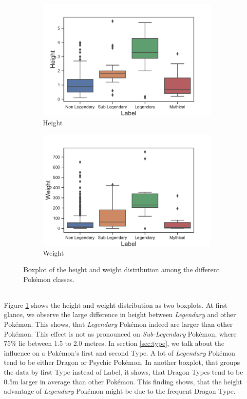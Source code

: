 \documentclass[conference]{IEEEtran}
\begin{document}
\begin{figure}[h]
	\centering
	\begin{subfigure}{0.4\textwidth}
		\includegraphics[width=\textwidth]{../../figures/boxplot_height.pdf}
		\caption{Height}
	\end{subfigure}
	\begin{subfigure}{0.4\textwidth}
	\includegraphics[width=\textwidth]{../../figures/boxplot_weight.pdf}
	\caption{Weight}
\end{subfigure}
\caption{Boxplot of the height and weight distribution among the different Pokémon classes.}
\label{fig:boxplot}
\end{figure}\\
Figure \ref{fig:boxplot} shows the height and weight distribution as two boxplots. At first glance, we observe the large difference in height between \textit{Legendary} and other Pokémon. This shows, that \textit{Legendary} Pokémon indeed are larger than other Pokémon. This effect is not as pronounced on \textit{Sub-Legendary} Pokémon, where $75\%$ lie between 1.5 to 2.0 metres. In section \ref{sec:type}, we talk about the influence on a Pokémon's first and second Type. A lot of \textit{Legendary} Pokémon tend to be either Dragon or Psychic Pokémon. In another boxplot, that groups the data by first Type instead of Label, it shows, that Dragon Types tend to be 0.5m larger in average than other Pokémon. This finding shows, that the height advantage of \textit{Legendary} Pokémon might be due to the frequent Dragon Type.\\
\end{document}
